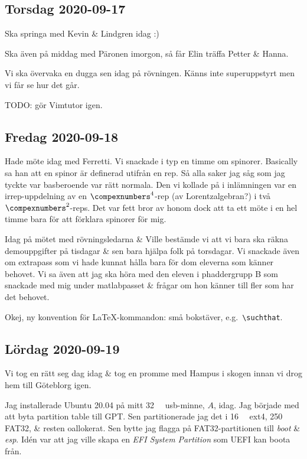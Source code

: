 \subsection{Torsdag 2020-09-17}

Ska springa med Kevin \& Lindgren idag :)

\bigskip

Ska även på middag med Päronen imorgon, så får Elin träffa Petter \& Hanna.

\bigskip

Vi ska övervaka en dugga sen idag på rövningen. Känns inte superuppstyrt men vi får se hur det går.

\bigskip

TODO: gör Vimtutor igen.


\subsection{Fredag 2020-09-18}

Hade möte idag med Ferretti. Vi snackade i typ en timme om spinorer. Basically sa han att en spinor är definerad utifrån en rep. Så alla saker jag såg som jag tyckte var basberoende var rätt normala. Den vi kollade på i inlämningen var en irrep-uppdelning av en $\compexnumbers^4$-rep (av Lorentzalgebran?) i två $\compexnumbers^2$-reps. Det var fett bror av honom dock att ta ett möte i en hel timme bara för att förklara spinorer för mig.

Idag på mötet med rövningsledarna \& Ville bestämde vi att vi bara ska räkna demouppgifter på tisdagar \& sen bara hjälpa folk på torsdagar. Vi snackade även om extrapass som vi hade kunnat hålla bara för dom eleverna som känner behovet. Vi sa även att jag ska höra med den eleven i phaddergrupp B som snackade med mig under matlabpasset \& frågar om hon känner till fler som har det behovet.

\bigskip

Okej, ny konvention för \LaTeX-kommandon: små bokstäver, e.g.\ \verb|\suchthat|.


\subsection{Lördag 2020-09-19}

Vi tog en rätt seg dag idag \& tog en promme med Hampus i skogen innan vi drog hem till Göteblorg igen.

\bigskip

Jag installerade Ubuntu 20.04 på mitt \SI{32}{\giga \byte} usb-minne, $A$, idag. Jag började med att byta partition table till GPT. Sen partitionerade jag det i \SI{16}{\giga \byte} ext4, \SI{250}{\mega \byte} FAT32, \& resten oallokerat. Sen bytte jag flagga på FAT32-partitionen till \emph{boot} \& \emph{esp}. Idén var att jag ville skapa en \emph{EFI System Partition} som UEFI kan boota från.

